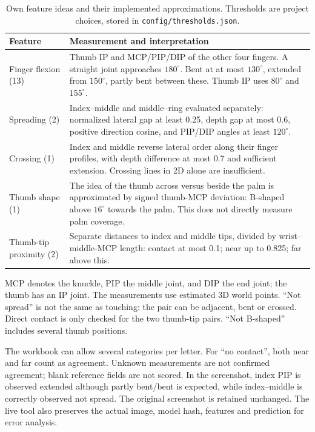 \begin{table}[h]\centering\small
\caption{Own feature ideas and their implemented approximations. Thresholds are project choices, stored in \texttt{config/thresholds.json}.}
\begin{tabular}{p{.20\linewidth}p{.70\linewidth}}\toprule
Feature & Measurement and interpretation\\\midrule
Finger flexion (13) & Thumb IP and MCP/PIP/DIP of the other four fingers. A straight joint approaches $180^\circ$. Bent at at most $130^\circ$, extended from $150^\circ$, partly bent between these. Thumb IP uses $80^\circ$ and $155^\circ$.\\
Spreading (2) & Index--middle and middle--ring evaluated separately: normalized lateral gap at least 0.25, depth gap at most 0.6, positive direction cosine, and PIP/DIP angles at least $120^\circ$.\\
Crossing (1) & Index and middle reverse lateral order along their finger profiles, with depth difference at most 0.7 and sufficient extension. Crossing lines in 2D alone are insufficient.\\
Thumb shape (1) & The idea of the thumb across versus beside the palm is approximated by signed thumb-MCP deviation: B-shaped above $16^\circ$ towards the palm. This does not directly measure palm coverage.\\
Thumb-tip proximity (2) & Separate distances to index and middle tips, divided by wrist--middle-MCP length: contact at most 0.1; near up to 0.825; far above this.\\\bottomrule
\end{tabular}
\end{table}

MCP denotes the knuckle, PIP the middle joint, and DIP the end joint; the thumb has an IP joint. The measurements use estimated 3D world points. ``Not spread'' is not the same as touching: the pair can be adjacent, bent or crossed. Direct contact is only checked for the two thumb-tip pairs. ``Not B-shaped'' includes several thumb positions.

The workbook can allow several categories per letter. For ``no contact'', both near and far count as agreement. Unknown measurements are not confirmed agreement; blank reference fields are not scored. In the screenshot, index PIP is observed extended although partly bent/bent is expected, while index--middle is correctly observed not spread. The original screenshot is retained unchanged. The live tool also preserves the actual image, model hash, features and prediction for error analysis.

